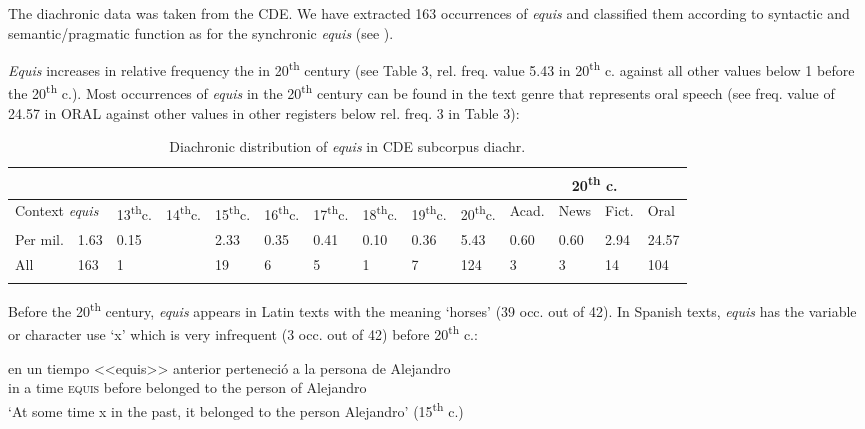 \documentclass[output=paper
,modfonts
,nonflat]{langsci/langscibook}
\begin{document}
The diachronic data was taken from the CDE. We have extracted 163 occurrences of \textit{equis} and classified them according to syntactic and semantic/pragmatic function as for the synchronic \textit{equis} (see ).

\textit{Equis} increases in relative frequency the in 20\textsuperscript{th} century (see Table 3, rel. freq. value 5.43 in 20\textsuperscript{th} c. against all other values below 1 before the 20\textsuperscript{th} c.). Most occurrences of \textit{equis} in the 20\textsuperscript{th} century can be found in the text genre that represents oral speech (see freq. value of 24.57 in ORAL against other values in other registers below rel. freq. 3 in Table 3):

\begin{table}
\caption{Diachronic distribution of \textit{equis} in CDE subcorpus diachr.}
\label{tab:3:Equis MexSp. CDE}
 \begin{tabularx}{\textwidth}{XXXXXXXXXX|XXXX}
  \lsptoprule
 & &  &  &  &  &  &  &  &  & \multicolumn{4}{c}{20\textsuperscript{th} c.\cellcolor[gray]{0.8}}\\
  \midrule
  \multicolumn{2}{p{1.5cm}}{Context \textit{equis}} & 13\textsuperscript{th}c. & 14\textsuperscript{th}c. & 15\textsuperscript{th}c. & 16\textsuperscript{th}c. & 17\textsuperscript{th}c. & 18\textsuperscript{th}c. & 19\textsuperscript{th}c. & 20\textsuperscript{th}c. & Acad. & News & Fict. & Oral\\
  \midrule
  Per mil.  & 1.63 & 0.15 &  & 2.33 & 0.35 & 0.41 & 0.10 & 0.36 & 5.43\cellcolor[gray]{0.8} & 0.60 & 0.60 & 2.94 & \footnotesize 24.57\cellcolor[gray]{0.6}\\
  \midrule
  All & 163 & 1 &  & 19 & 6 & 5 & 1 & 7 & 124\cellcolor[gray]{0.8} & 3 & 3 & 14 & 104\cellcolor[gray]{0.6}\\
  \lspbottomrule
 \end{tabularx}
\end{table}

Before the 20\textsuperscript{th} century, \textit{equis} appears in Latin texts with the meaning ‘horses’ (39 occ. out of 42). In Spanish texts, \textit{equis} has the variable or character use ‘x’ which is very infrequent (3 occ. out of 42) before 20\textsuperscript{th} c.:

\ea
\gll en un tiempo <<equis>> anterior perteneció a la persona de Alejandro\\
in a time \textsc{equis} before belonged to the person of Alejandro\\
\glt ‘At some time x in the past, it belonged to the person Alejandro’ (15\textsuperscript{th} c.)
\z
\end{document}
